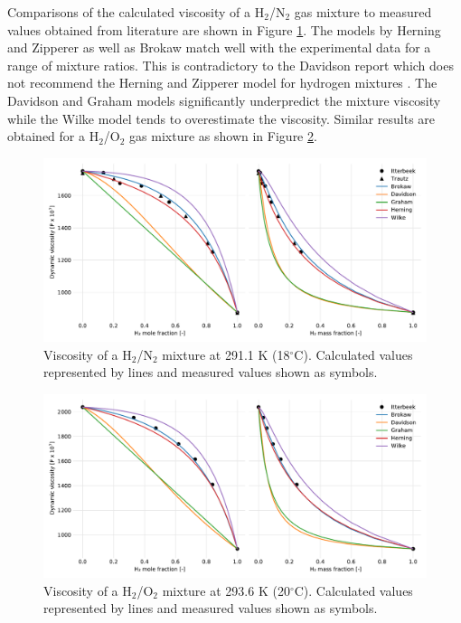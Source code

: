 Comparisons of the calculated viscosity of a H$_2$/N$_2$ gas mixture to measured values obtained from literature are shown in Figure \ref{fig:gas-mu-h2n2-validate}. The models by Herning and Zipperer as well as Brokaw match well with the experimental data for a range of mixture ratios. This is contradictory to the Davidson report which does not recommend the Herning and Zipperer model for hydrogen mixtures \cite{Davidson-1993}. The Davidson and Graham models significantly underpredict the mixture viscosity while the Wilke model tends to overestimate the viscosity. Similar results are obtained for a H$_2$/O$_2$ gas mixture as shown in Figure \ref{fig:gas-mu-h2o2-validate}.

\begin{figure}[H]
    \centering
    \includegraphics[width=\textwidth]{figures/gas-mu-h2n2-validate.pdf}
    \caption{Viscosity of a H$_2$/N$_2$ mixture at 291.1 K (18$^\circ$C). Calculated values represented by lines and measured values shown as symbols.}
    \label{fig:gas-mu-h2n2-validate}
\end{figure}

\begin{figure}[H]
    \centering
    \includegraphics[width=\textwidth]{figures/gas-mu-h2o2-validate.pdf}
    \caption{Viscosity of a H$_2$/O$_2$ mixture at 293.6 K (20$^\circ$C). Calculated values represented by lines and measured values shown as symbols.}
    \label{fig:gas-mu-h2o2-validate}
\end{figure}

